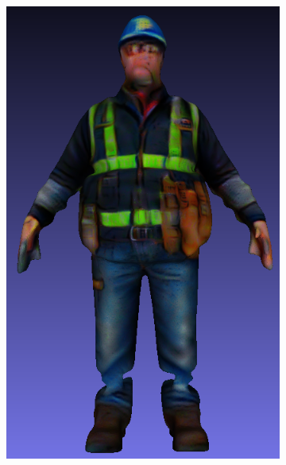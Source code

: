 \begin{figure}[H]
\begin{subfigure}[b]{0.198\textwidth}
        \includegraphics[width=\textwidth]{etc/bias/bias_engineer_genie_3.png}
        \caption{}
    \end{subfigure}
    \begin{subfigure}[b]{0.324\textwidth}
        \centering

\end{subfigure}
\end{figure}
